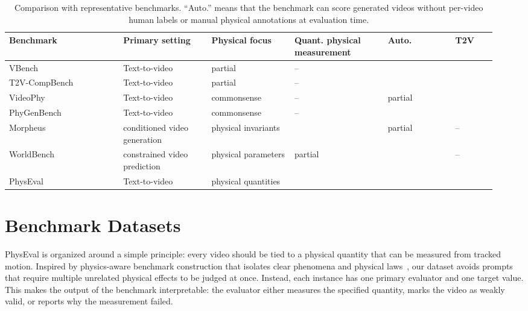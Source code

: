 \documentclass{article}
\newcommand{\bench}{PhysEval}
\newcommand{\cmark}{\checkmark}
\begin{document}
\begin{table}[H]
\centering
\scriptsize
\setlength{\tabcolsep}{2pt}
\caption{Comparison with representative benchmarks. ``Auto.'' means that the benchmark can score generated videos without per-video human labels or manual physical annotations at evaluation time.}
\label{tab:benchmark-comparison}
\begin{tabular}{@{}>{\raggedright\arraybackslash}p{0.22\linewidth}>{\centering\arraybackslash}p{0.17\linewidth}>{\centering\arraybackslash}p{0.16\linewidth}>{\centering\arraybackslash}p{0.18\linewidth}>{\centering\arraybackslash}p{0.13\linewidth}>{\centering\arraybackslash}p{0.08\linewidth}@{}}
\toprule
Benchmark & Primary setting & Physical focus & Quant. physical measurement & Auto. & T2V \\
\midrule
VBench~\citep{huang2023vbench} & Text-to-video & partial & -- & \cmark{} & \cmark{} \\
T2V-CompBench~\citep{sun2025t2vcompbench} & Text-to-video & partial & -- & \cmark{} & \cmark{} \\
VideoPhy~\citep{bansal2024videophy} & Text-to-video & commonsense & -- & partial & \cmark{} \\
PhyGenBench~\citep{meng2024phygenbench} & Text-to-video & commonsense & -- & \cmark{} & \cmark{} \\
Morpheus~\citep{zhang2025morpheus} & conditioned video generation & physical invariants & \cmark{} & partial & -- \\
WorldBench~\citep{upadhyay2026worldbench} & constrained video prediction & physical parameters & partial & \cmark{} & -- \\
\bench{} & Text-to-video & physical quantities & \cmark{} & \cmark{} & \cmark{} \\
\bottomrule
\end{tabular}
\end{table}

\section{Benchmark Datasets}

\bench{} is organized around a simple principle: every video should be tied to a physical quantity that can be measured from tracked motion.
Inspired by physics-aware benchmark construction that isolates clear phenomena and physical laws~\citep{meng2024phygenbench}, our dataset avoids prompts that require multiple unrelated physical effects to be judged at once.
Instead, each instance has one primary evaluator and one target value.
This makes the output of the benchmark interpretable: the evaluator either measures the specified quantity, marks the video as weakly valid, or reports why the measurement failed.
\end{document}
